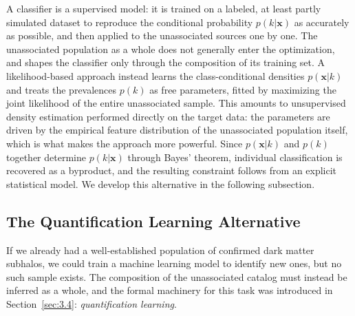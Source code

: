 A classifier is a supervised model: it is trained on a labeled, at least partly simulated dataset to reproduce the conditional probability $p(k|\mathbf{x})$ as accurately as possible, and then applied to the unassociated sources one by one.
The unassociated population as a whole does not generally enter the optimization, and shapes the classifier only through the composition of its training set.
A likelihood-based approach instead learns the class-conditional densities $p(\mathbf{x}|k)$ and treats the prevalences $p(k)$ as free parameters, fitted by maximizing the joint likelihood of the entire unassociated sample.
This amounts to unsupervised density estimation performed directly on the target data: the parameters are driven by the empirical feature distribution of the unassociated population itself, which is what makes the approach more powerful.
Since $p(\mathbf{x}|k)$ and $p(k)$ together determine $p(k|\mathbf{x})$ through Bayes' theorem, individual classification is recovered as a byproduct, and the resulting constraint follows from an explicit statistical model.
We develop this alternative in the following subsection.

\subsection{The Quantification Learning Alternative}
\label{sec:5.4.3}
If we already had a well-established population of confirmed dark matter subhalos, we could train a machine learning model to identify new ones, but no such sample exists.
The composition of the unassociated catalog must instead be inferred as a whole, and the formal machinery for this task was introduced in Section~\ref{sec:3.4}: \textit{quantification learning}.

